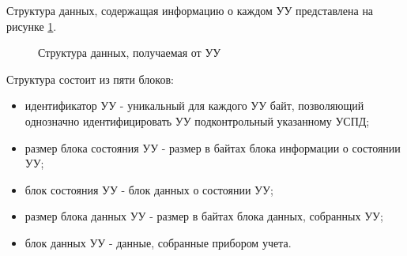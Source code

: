 Структура данных, содержащая информацию о каждом УУ представлена на рисунке \ref{img:UU_struct}.

\begin{figure}[!ht]
 \caption{Структура данных, получаемая от УУ}
 \label{img:UU_struct}
\end{figure}

Структура состоит из пяти блоков:

\begin{itemize}
 \item идентификатор УУ - уникальный для каждого УУ байт, позволяющий однозначно идентифицировать УУ подконтрольный указанному УСПД;
 \item размер блока состояния УУ - размер в байтах блока информации о состоянии УУ;
 \item блок состояния УУ - блок данных о состоянии УУ;
 \item размер блока данных УУ - размер в байтах блока данных, собранных УУ;
 \item блок данных УУ - данные, собранные прибором учета.
\end{itemize}
